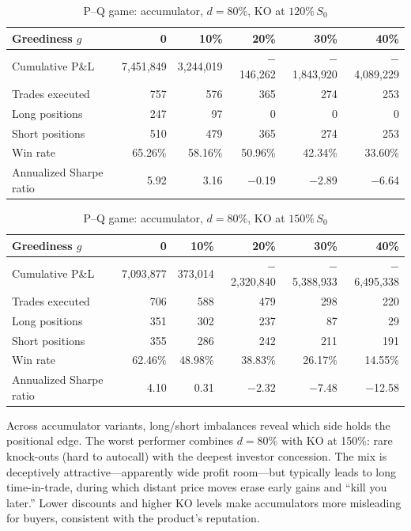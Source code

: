 \documentclass[12pt,letterpaper]{article}
\begin{document}
\begin{table}[ht]
\singlespacing
\centering
\caption{P--Q game: accumulator, $d = 80\%$, KO at $120\%\,S_0$}
\label{tab:acc3}
\begin{tabular}{lrrrrr}
\toprule
Greediness $g$ & 0 & 10\% & 20\% & 30\% & 40\% \\
\midrule
Cumulative P\&L & 7{,}451{,}849 & 3{,}244{,}019 & $-$146{,}262 & $-$1{,}843{,}920 & $-$4{,}089{,}229 \\
Trades executed & 757 & 576 & 365 & 274 & 253 \\
Long positions  & 247 & 97 & 0 & 0 & 0 \\
Short positions & 510 & 479 & 365 & 274 & 253 \\
Win rate & 65.26\% & 58.16\% & 50.96\% & 42.34\% & 33.60\% \\
Annualized Sharpe ratio & 5.92 & 3.16 & $-$0.19 & $-$2.89 & $-$6.64 \\
\bottomrule
\end{tabular}
\end{table}

\begin{table}[ht]
\singlespacing
\centering
\caption{P--Q game: accumulator, $d = 80\%$, KO at $150\%\,S_0$}
\label{tab:acc4}
\begin{tabular}{lrrrrr}
\toprule
Greediness $g$ & 0 & 10\% & 20\% & 30\% & 40\% \\
\midrule
Cumulative P\&L & 7{,}093{,}877 & 373{,}014 & $-$2{,}320{,}840 & $-$5{,}388{,}933 & $-$6{,}495{,}338 \\
Trades executed & 706 & 588 & 479 & 298 & 220 \\
Long positions  & 351 & 302 & 237 & 87 & 29 \\
Short positions & 355 & 286 & 242 & 211 & 191 \\
Win rate & 62.46\% & 48.98\% & 38.83\% & 26.17\% & 14.55\% \\
Annualized Sharpe ratio & 4.10 & 0.31 & $-$2.32 & $-$7.48 & $-$12.58 \\
\bottomrule
\end{tabular}
\end{table}

Across accumulator variants, long/short imbalances reveal which side holds
the positional edge. The worst performer combines $d = 80\%$ with KO at
150\%: rare knock-outs (hard to autocall) with the deepest investor
concession. The mix is deceptively attractive---apparently wide profit
room---but typically leads to long time-in-trade, during which distant price
moves erase early gains and ``kill you later.'' Lower discounts and higher
KO levels make accumulators more misleading for buyers, consistent with the
product's reputation.
\end{document}
